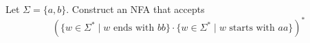   Let $\Sigma = \{a,b\}$.
  Construct an NFA that accepts 
  \[
    ( 
    \{ w \in \Sigma^* \mid w \text{ ends with $bb$} \} \cdot
    \{ w \in \Sigma^* \mid w \text{ starts with $aa$} \}
    )^*
  \]
